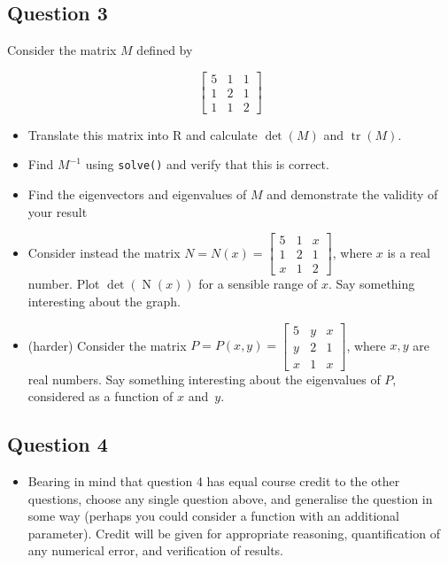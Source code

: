 \documentclass[nojss]{jss}\usepackage[]{graphicx}\usepackage[]{color}
\begin{document}
\subsection*{Question 3}
 
Consider the matrix $M$ defined by


\[
\begin{bmatrix}
  5&1&1\\
  1&2&1\\
  1&1&2
  \end{bmatrix}
\]


\begin{itemize}
\item Translate this matrix into R and calculate $\operatorname{det}\left(M\right)$ and $\operatorname{tr}\left(M\right)$. 
\item Find $M^{-1}$ using {\tt solve()} and verify that this is correct.
\item Find the eigenvectors and eigenvalues of $M$ and demonstrate the validity of your result
\item Consider instead the matrix $N=N(x)=\begin{bmatrix}
  5&1&x\\
  1&2&1\\
  x&1&2
  \end{bmatrix}$, where $x$ is a real number.  Plot $\operatorname{det}\left(\operatorname{N}(x)\right)$  for a sensible range of $x$.  Say something interesting about the graph.  
  \item  (harder) Consider the matrix $P=P(x,y)=\begin{bmatrix}
  5&y&x\\
  y&2&1\\
  x&1&x
  \end{bmatrix}$, where $x,y$ are real numbers.  Say something interesting about the eigenvalues of $P$, considered as a function of $x$ and~$y$.
\end{itemize} 

\subsection*{Question 4}

\begin{itemize}
  \item 
    Bearing in mind that question 4 has equal course credit to the
    other questions, choose any single question above, and generalise
    the question in some way (perhaps you could consider a function
    with an additional parameter).  Credit will be given for
    appropriate reasoning, quantification of any numerical error, and
    verification of results.
    \end{itemize}


 
\end{document}
